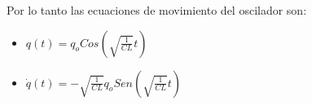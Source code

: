 
Por lo tanto las ecuaciones de movimiento del oscilador son:

\begin{itemize}
    \item $q(t) = q_{o} Cos \left( \sqrt{ \frac{1}{CL} } t \right)$
    \item $\dot{q}(t) = - \sqrt{ \frac{1}{CL} } q_{o} Sen \left(  \sqrt{ \frac{1}{CL} } t \right)$
\end{itemize}
